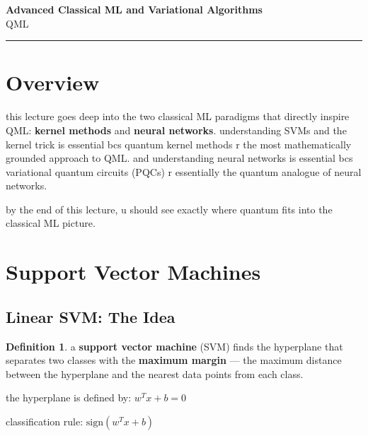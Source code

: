 \documentclass[11pt,a4paper]{article}
\theoremstyle{definition}
\newtheorem{definition}{Definition}[section]
\theoremstyle{remark}
\begin{document}
\begin{center}
    {\LARGE \textbf{Advanced Classical ML and Variational Algorithms}}\\[8pt]
    {\large QML}\\[12pt]
    \hrule
\end{center}

\vspace{12pt}
\tableofcontents
\newpage

\section{Overview}

this lecture goes deep into the two classical ML paradigms that directly inspire QML: \textbf{kernel methods} and \textbf{neural networks}. understanding SVMs and the kernel trick is essential bcs quantum kernel methods r the most mathematically grounded approach to QML. and understanding neural networks is essential bcs variational quantum circuits (PQCs) r essentially the quantum analogue of neural networks.

by the end of this lecture, u should see exactly where quantum fits into the classical ML picture.

\section{Support Vector Machines}

\subsection{Linear SVM: The Idea}

\begin{definition}
a \textbf{support vector machine} (SVM) finds the hyperplane that separates two classes with the \textbf{maximum margin} --- the maximum distance between the hyperplane and the nearest data points from each class.
\end{definition}

the hyperplane is defined by: $w^T x + b = 0$

classification rule: $\text{sign}(w^T x + b)$
\end{document}

